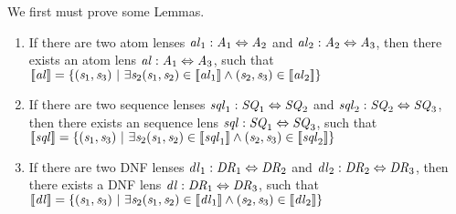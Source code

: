 We first must prove some Lemmas.

\begin{lemma}\leavevmode
\label{lem:composition-completeness}
\begin{enumerate}
\item If there are two atom lenses
$\mathit{al}_1 : \mathit{A}_1 \Leftrightarrow \mathit{A}_2$ and
$\mathit{al}_2 : \mathit{A}_2 \Leftrightarrow \mathit{A}_3$,
then there exists an atom lens
$\mathit{al} : \mathit{A}_1 \Leftrightarrow \mathit{A}_3$, such that
$[ \! [\mathit{al}] \! ]=\{(\mathit{s}_1,\mathit{s}_3)~|~
\exists\mathit{s}_2
(\mathit{s}_1,\mathit{s}_2)\in[ \! [\mathit{al}_1] \! ]\wedge
(\mathit{s}_2,\mathit{s}_3)\in[ \! [\mathit{al}_2] \! ]\}$

\item If there are two sequence lenses
$\mathit{sql}_1 : \mathit{SQ}_1 \Leftrightarrow \mathit{SQ}_2$ and
$\mathit{sql}_2 : \mathit{SQ}_2 \Leftrightarrow \mathit{SQ}_3$,
then there exists an sequence lens
$\mathit{sql} : \mathit{SQ}_1 \Leftrightarrow \mathit{SQ}_3$, such that
$[ \! [\mathit{sql}] \! ]=\{(\mathit{s}_1,\mathit{s}_3)~|~
\exists\mathit{s}_2
(\mathit{s}_1,\mathit{s}_2)\in[ \! [\mathit{sql}_1] \! ]\wedge
(\mathit{s}_2,\mathit{s}_3)\in[ \! [\mathit{sql}_2] \! ]\}$

\item If there are two DNF lenses
$\mathit{dl}_1 : \mathit{DR}_1 \Leftrightarrow \mathit{DR}_2$ and
$\mathit{dl}_2 : \mathit{DR}_2 \Leftrightarrow \mathit{DR}_3$,
then there exists a DNF lens
$\mathit{dl} : \mathit{DR}_1 \Leftrightarrow \mathit{DR}_3$, such that
$[ \! [\mathit{dl}] \! ]=\{(\mathit{s}_1,\mathit{s}_3)~|~
\exists\mathit{s}_2
(\mathit{s}_1,\mathit{s}_2)\in[ \! [\mathit{dl}_1] \! ]\wedge
(\mathit{s}_2,\mathit{s}_3)\in[ \! [\mathit{dl}_2] \! ]\}$
\end{enumerate}
\end{lemma}

